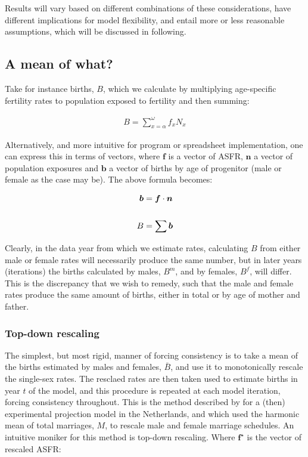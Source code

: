 \documentclass[reqno,12pt,oneside,a4paper]{report} %
\theoremstyle{plain}
\theoremstyle{definition}
\theoremstyle{remark}
\numberwithin{theorem}{chapter}     %
\begin{document}
Results will vary based on different combinations of these considerations, have different implications for model flexibility, and entail more or less reasonable assumptions, which will be discussed in following. 

\subsection{A mean of what?}
Take for instance births, $B$, which we calculate by multiplying age-specific fertility rates to population exposed to fertility and then summing:

\begin{align}
B = \sum _{x=\alpha} ^{\omega} f_x N_x
\end{align}

Alternatively, and more intuitive for program or spreadsheet implementation, one can express this in terms of vectors, where $\bm{f}$ is a vector of ASFR, $\bm{n}$ a vector of population exposures and $\bm{b}$ a vector of births by age of progenitor (male or female as the case may be). The above formula becomes:

\begin{align}
\bm{b} &= \bm{f}\cdot\bm{n} \notag \\ \notag \\
B &= \sum \bm{b}
\label{birthvec}
\end{align}

Clearly, in the data year from which we estimate rates, calculating $B$ from either male or female rates will necessarily produce the same number, but in later years (iterations) the births calculated by males, $B^m$, and by females, $B^f$, will differ. This is the discrepancy that we wish to remedy, such that the male and female rates produce the same amount of births, either in total or by age of mother and father.

\subsubsection{Top-down rescaling}
The simplest, but most rigid, manner of forcing consistency is to take a mean of the births estimated by males and females, $\bar{B}$, and use it to monotonically rescale the single-sex rates. The resclaed rates are then taken used to estimate births in year $t$ of the model, and this procedure is repeated at each model iteration, forcing consistency throughout. This is the method described by \citet{keilman1985nuptiality} for a (then) experimental projection model in the Netherlands, and which used the harmonic mean of total marriages, $M$, to rescale male and female marriage schedules. An intuitive moniker for this method is top-down rescaling. Where $\bm{f^{\star}}$ is the vector of rescaled ASFR:
\end{document}
